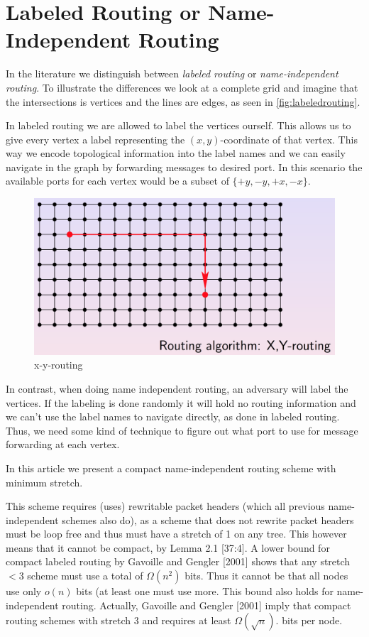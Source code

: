 \section{Labeled Routing or Name-Independent Routing}
In the literature we distinguish between \emph{labeled routing} or
\emph{name-independent routing}. To illustrate the differences we look at a complete
grid and imagine that the intersections is vertices and the lines are edges, as seen in \autoref{fig:labeledrouting}.

In labeled routing we are allowed to label the vertices ourself. This allows
us to give every vertex a label representing the $(x,y)$-coordinate of that
vertex. This way we encode topological information into the label names and we
can easily navigate in the graph by forwarding messages to desired port. In
this scenario the available ports for each vertex would be a subset of $\{+y,
-y, +x, -x\}$.
\begin{figure}[htbp]
    \centering
    \includegraphics[scale=0.3]{images/xyrouting.png}
    \caption{x-y-routing}
    \label{fig:labeledrouting}
\end{figure}

In contrast, when doing name independent routing, an adversary will label the
vertices. If the labeling is done randomly it will hold no routing information
and we can't use the label names to navigate directly, as done in labeled routing. Thus, we need some kind of
technique to figure out what port to use for message forwarding at each vertex.

In this article we present a compact name-independent routing scheme with minimum stretch.

This scheme requires (uses) rewritable packet headers (which all previous name-independent schemes also do), as a scheme that does not rewrite packet headers must be loop free and thus must have a stretch of 1 on any tree. This however means that it cannot be compact, by Lemma 2.1 \cite{compactNameIndepRouting}[37:4]. A lower bound for compact labeled routing by Gavoille and Gengler [2001] shows that any stretch $< 3$ scheme must use a total of $\Omega(n^2)$ bits. Thus it cannot be that all nodes use only $o(n)$ bits (at least one must use more. This bound also holds for name-independent routing. Actually, Gavoille and Gengler [2001] imply that compact routing schemes with stretch 3 and requires at least $\Omega(\sqrt{n})$. bits per node.

